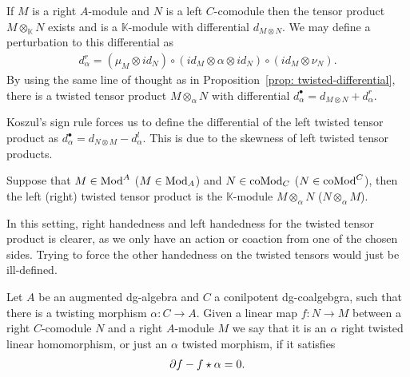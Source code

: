\documentclass[../thesis.tex]{subfiles}
\begin{document}
            If $M$ is a right $A$-module and $N$ is a left $C$-comodule then the tensor product $M\otimes_\mathbb{K} N$ exists and is a $\mathbb{K}$-module with differential $d_{M\otimes N}$. We may define a perturbation to this differential as 
            \begin{align*}
                d_\alpha^r = (\mu_M\otimes id_N) \circ (id_M \otimes \alpha \otimes id_N) \circ (id_M \otimes \nu_N).
            \end{align*}
            By using the same line of thought as in Proposition~\ref{prop: twisted-differential}, there is a twisted tensor product $M\otimes_\alpha N$ with differential $d_\alpha^\bullet = d_{M\otimes N} + d_\alpha^r$.

            \begin{remark}
                Koszul's sign rule forces us to define the differential of the left twisted tensor product as $d_\alpha^\bullet = d_{N\otimes M} - d_\alpha^l$. This is due to the skewness of left twisted tensor products.
            \end{remark}
            
            \begin{definition}
                Suppose that $M\in \tt{Mod}^A$ ($M\in \tt{Mod}_A$) and $N\in \tt{coMod}_C$ ($N\in \tt{coMod}^C$), then the left (right) twisted tensor product is the $\mathbb{K}$-module $M\otimes_\alpha N$ ($N\otimes_\alpha M$).
            \end{definition}

            In this setting, right handedness and left handedness for the twisted tensor product is clearer, as we only have an action or coaction from one of the chosen sides. Trying to force the other handedness on the twisted tensors would just be ill-defined.

            \begin{definition}
                Let $A$ be an augmented dg-algebra and $C$ a conilpotent dg-coalgebgra, such that there is a twisting morphism $\alpha: C\rightarrow A$. Given a linear map $f: N \rightarrow M$ between a right $C$-comodule $N$ and a right $A$-module $M$ we say that it is an $\alpha$ right twisted linear homomorphism, or just an  $\alpha$ twisted morphism, if it satisfies
                \begin{align*}
                    \partial f - f\star \alpha = 0\tt{.}
                \end{align*} 
            \end{definition}
\end{document}
